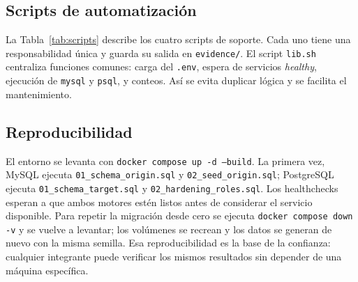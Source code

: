 \subsection{Scripts de automatización}

La Tabla~\ref{tab:scripts} describe los cuatro scripts de soporte. Cada uno
tiene una responsabilidad única y guarda su salida en \texttt{evidence/}. El
script \texttt{lib.sh} centraliza funciones comunes: carga del \texttt{.env},
espera de servicios \emph{healthy}, ejecución de \texttt{mysql} y
\texttt{psql}, y conteos. Así se evita duplicar lógica y se facilita el
mantenimiento.

\begin{table}[H]
  \centering
  \caption{Scripts de automatización}
  \label{tab:scripts}
\end{table}

\subsection{Reproducibilidad}

El entorno se levanta con \texttt{docker compose up -d --build}. La primera
vez, MySQL ejecuta \texttt{01\_schema\_origin.sql} y
\texttt{02\_seed\_origin.sql}; PostgreSQL ejecuta
\texttt{01\_schema\_target.sql} y \texttt{02\_hardening\_roles.sql}. Los
healthchecks esperan a que ambos motores estén listos antes de considerar el
servicio disponible. Para repetir la migración desde cero se ejecuta
\texttt{docker compose down -v} y se vuelve a levantar; los volúmenes se
recrean y los datos se generan de nuevo con la misma semilla. Esa
reproducibilidad es la base de la confianza: cualquier integrante puede
verificar los mismos resultados sin depender de una máquina específica.

